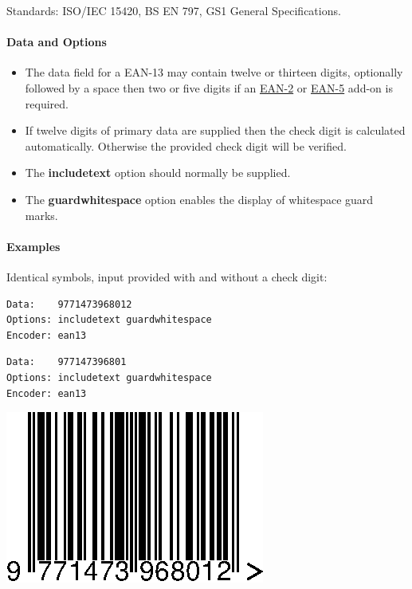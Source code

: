 Standards: ISO/IEC 15420, BS EN 797, GS1 General Specifications.

\hypertarget{data-and-options}{%
\paragraph{Data and Options}\label{data-and-options}}

\begin{itemize}
\tightlist
\item
  The data field for a EAN-13 may contain twelve or thirteen digits,
  optionally followed by a space then two or five digits if an
  \protect\hyperlink{ean-2}{EAN-2} or \protect\hyperlink{ean-5}{EAN-5}
  add-on is required.
\item
  If twelve digits of primary data are supplied then the check digit is
  calculated automatically. Otherwise the provided check digit will be
  verified.
\item
  The \textbf{includetext} option should normally be supplied.
\item
  The \textbf{guardwhitespace} option enables the display of whitespace
  guard marks.
\end{itemize}

\hypertarget{examples}{%
\paragraph{Examples}\label{examples}}

Identical symbols, input provided with and without a check digit:

\begin{verbatim}
Data:    9771473968012
Options: includetext guardwhitespace
Encoder: ean13
\end{verbatim}

\begin{verbatim}
Data:    977147396801
Options: includetext guardwhitespace
Encoder: ean13
\end{verbatim}

\includegraphics{images/ean13-1.eps}

